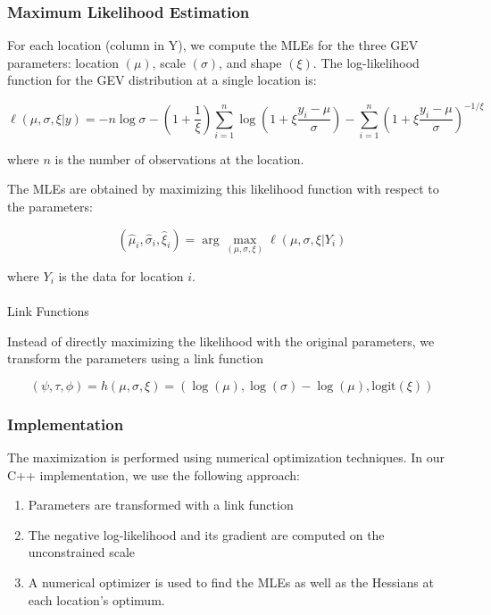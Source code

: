 \documentclass[
  letterpaper,
  DIV=11,
  numbers=noendperiod]{scrartcl}
\makeatletter
\let\oldparagraph\paragraph
\renewcommand{\paragraph}{
    \@ifstar
      \xxxParagraphStar
      \xxxParagraphNoStar
  }
\newcommand{\xxxParagraphStar}[1]{\oldparagraph*{#1}\mbox{}}
\newcommand{\xxxParagraphNoStar}[1]{\oldparagraph{#1}\mbox{}}
\providecommand{\tightlist}{%
  \setlength{\itemsep}{0pt}\setlength{\parskip}{0pt}}\usepackage{longtable,booktabs,array}
\makeatother
\begin{document}
\subsubsection{Maximum Likelihood
Estimation}\label{maximum-likelihood-estimation}

For each location (column in Y), we compute the MLEs for the three GEV
parameters: location \((\mu)\), scale \((\sigma)\), and shape \((\xi)\).
The log-likelihood function for the GEV distribution at a single
location is:

\[
\ell(\mu, \sigma, \xi | y) = -n\log\sigma - (1+\frac{1}{\xi})\sum_{i=1}^n \log\left(1+\xi\frac{y_i-\mu}{\sigma}\right) - \sum_{i=1}^n \left(1+\xi\frac{y_i-\mu}{\sigma}\right)^{-1/\xi}
\]

where \(n\) is the number of observations at the location.

The MLEs are obtained by maximizing this likelihood function with
respect to the parameters:

\[
(\hat{\mu}_i, \hat{\sigma}_i, \hat{\xi}_i) = \arg\max_{(\mu, \sigma, \xi)} \ell(\mu, \sigma, \xi | Y_i)
\]

where \(Y_i\) is the data for location \(i\).

\paragraph{Link Functions}\label{link-functions}

Instead of directly maximizing the likelihood with the original
parameters, we transform the parameters using a link function

\[
\left(\psi, \tau, \phi\right) = h(\mu, \sigma, \xi) = \left(\log(\mu), \log(\sigma) - \log(\mu), \text{logit}(\xi)\right)
\]

\subsubsection{Implementation}\label{implementation}

The maximization is performed using numerical optimization techniques.
In our C++ implementation, we use the following approach:

\begin{enumerate}
\def\labelenumi{\arabic{enumi}.}
\tightlist
\item
  Parameters are transformed with a link function
\item
  The negative log-likelihood and its gradient are computed on the
  unconstrained scale
\item
  A numerical optimizer is used to find the MLEs as well as the Hessians
  at each location's optimum.
\end{enumerate}
\end{document}
